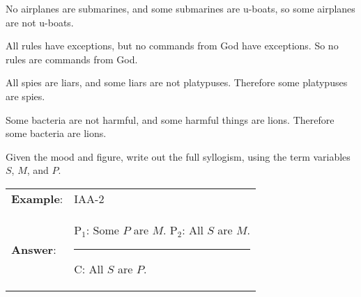 \begin{exercises}
\item No airplanes are submarines, and some submarines are u-boats, so some airplanes are not u-boats.

 
\item All rules have exceptions, but no commands from God have exceptions. So no rules are commands from God. 

 
\item All spies are liars, and some liars are not platypuses. Therefore some platypuses are spies.

 
\item Some bacteria are not harmful, and some harmful things are lions. Therefore some bacteria are lions. 
%
     
\end{exercises} 
 
\noindent\problempart Given the mood and figure, write out the full syllogism, using the term variables $S$, $M$, and $P$. 
\begin{longtabu}{p{.1\linewidth}p{.9\linewidth}} 
\textbf{Example}: &IAA-2 \\ 
\textbf{Answer}: & P$_1$: Some $P$ are $M$. \newline
P$_2$: All $S$ are $M$. 
\vskip -6pt
\rule{0.2\linewidth}{.5pt} \newline
C: All $S$ are $P$.
\end{longtabu} 

